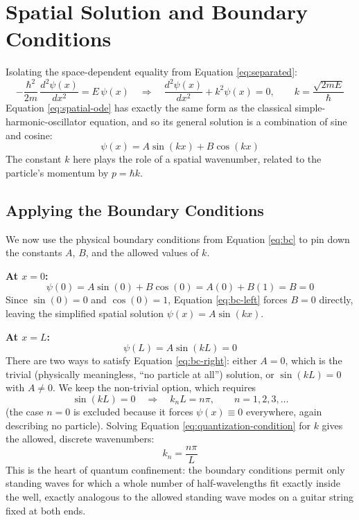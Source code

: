 \documentclass[12pt, a4paper]{article}
\begin{document}
\section{Spatial Solution and Boundary Conditions}
Isolating the space-dependent equality from Equation
\eqref{eq:separated}:
\begin{equation}
    -\frac{\hbar^2}{2m}\, \frac{d^2\psi(x)}{dx^2} = E\,\psi(x)
    \quad \Longrightarrow \quad
    \frac{d^2\psi(x)}{dx^2} + k^2 \psi(x) = 0,
    \qquad k = \frac{\sqrt{2mE}}{\hbar}
    \label{eq:spatial-ode}
\end{equation}
Equation \eqref{eq:spatial-ode} has exactly the same form as the
classical simple-harmonic-oscillator equation, and so its general
solution is a combination of sine and cosine:
\begin{equation}
    \psi(x) = A\sin(kx) + B\cos(kx)
    \label{eq:spatial-general}
\end{equation}
The constant $k$ here plays the role of a spatial wavenumber, related
to the particle's momentum by $p = \hbar k$.

\subsection*{Applying the Boundary Conditions}
We now use the physical boundary conditions from Equation
\eqref{eq:bc} to pin down the constants $A$, $B$, and the allowed
values of $k$.

\textbf{At $x = 0$:}
\begin{equation}
    \psi(0) = A\sin(0) + B\cos(0) = A(0) + B(1) = B = 0
    \label{eq:bc-left}
\end{equation}
Since $\sin(0)=0$ and $\cos(0)=1$, Equation \eqref{eq:bc-left} forces
$B=0$ directly, leaving the simplified spatial solution
$\psi(x) = A\sin(kx)$.

\textbf{At $x = L$:}
\begin{equation}
    \psi(L) = A\sin(kL) = 0
    \label{eq:bc-right}
\end{equation}
There are two ways to satisfy Equation \eqref{eq:bc-right}: either
$A = 0$, which is the trivial (physically meaningless, ``no particle
at all'') solution, or $\sin(kL) = 0$ with $A \neq 0$. We keep the
non-trivial option, which requires
\begin{equation}
    \sin(kL) = 0 \quad \Longrightarrow \quad k_n L = n\pi,
    \qquad n = 1, 2, 3, \dots
    \label{eq:quantization-condition}
\end{equation}
(the case $n=0$ is excluded because it forces $\psi(x)\equiv 0$
everywhere, again describing no particle). Solving Equation
\eqref{eq:quantization-condition} for $k$ gives the allowed,
discrete wavenumbers:
\begin{equation}
    \boxed{k_n = \dfrac{n\pi}{L}}
    \label{eq:kn}
\end{equation}
This is the heart of quantum confinement: the boundary conditions
permit only standing waves for which a whole number of half-wavelengths
fit exactly inside the well, exactly analogous to the allowed standing
wave modes on a guitar string fixed at both ends.
\end{document}
